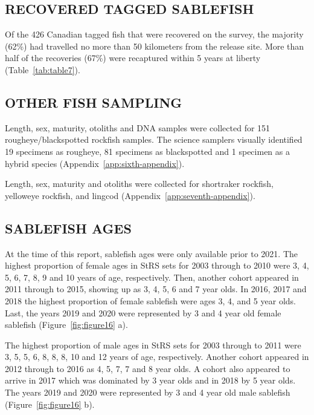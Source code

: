 \documentclass[12pt]{article}\usepackage[]{graphicx}\usepackage[]{color}
\begin{document}
\hypertarget{recovered-tagged-sablefish}{%
\subsection{RECOVERED TAGGED SABLEFISH}\label{recovered-tagged-sablefish}}

Of the 426 Canadian tagged fish that were recovered on the survey, the majority (62\%) had travelled no more than 50 kilometers from the release site. More than half of the recoveries (67\%) were recaptured within 5 years at liberty (Table~\ref{tab:table7}).

\hypertarget{other-fish-sampling}{%
\subsection{OTHER FISH SAMPLING}\label{other-fish-sampling}}

Length, sex, maturity, otoliths and DNA samples were collected for 151 rougheye/blackspotted rockfish samples. The science samplers visually identified 19 specimens as rougheye, 81 specimens as blackspotted and 1 specimen as a hybrid species (Appendix~\ref{app:sixth-appendix}).

Length, sex, maturity and otoliths were collected for shortraker rockfish, yelloweye rockfish, and lingcod (Appendix~\ref{app:seventh-appendix}).

\hypertarget{sablefish-ages}{%
\subsection{SABLEFISH AGES}\label{sablefish-ages}}

At the time of this report, sablefish ages were only available prior to 2021. The highest proportion of female ages in StRS sets for 2003 through to 2010 were 3, 4, 5, 6, 7, 8, 9 and 10 years of age, respectively. Then, another cohort appeared in 2011 through to 2015, showing up as 3, 4, 5, 6 and 7 year olds. In 2016, 2017 and 2018 the highest proportion of female sablefish were ages 3, 4, and 5 year olds. Last, the years 2019 and 2020 were represented by 3 and 4 year old female sablefish (Figure~\ref{fig:figure16} a).

The highest proportion of male ages in StRS sets for 2003 through to 2011 were 3, 5, 5, 6, 8, 8, 8, 10 and 12 years of age, respectively. Another cohort appeared in 2012 through to 2016 as 4, 5, 7, 7 and 8 year olds. A cohort also appeared to arrive in 2017 which was dominated by 3 year olds and in 2018 by 5 year olds. The years 2019 and 2020 were represented by 3 and 4 year old male sablefish (Figure~\ref{fig:figure16} b).
\end{document}
